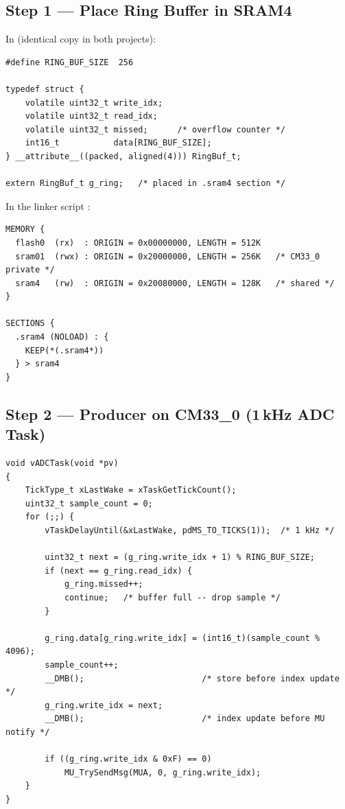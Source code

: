 \documentclass[11pt, a4paper]{article}
\begin{document}
\subsection{Step 1 --- Place Ring Buffer in SRAM4}

In  (identical copy in both projects):

\begin{lstlisting}[style=cstyle]
#define RING_BUF_SIZE  256

typedef struct {
    volatile uint32_t write_idx;
    volatile uint32_t read_idx;
    volatile uint32_t missed;      /* overflow counter */
    int16_t           data[RING_BUF_SIZE];
} __attribute__((packed, aligned(4))) RingBuf_t;

extern RingBuf_t g_ring;   /* placed in .sram4 section */
\end{lstlisting}

In the linker script :

\begin{lstlisting}[style=textstyle]
MEMORY {
  flash0  (rx)  : ORIGIN = 0x00000000, LENGTH = 512K
  sram01  (rwx) : ORIGIN = 0x20000000, LENGTH = 256K   /* CM33_0 private */
  sram4   (rw)  : ORIGIN = 0x20080000, LENGTH = 128K   /* shared */
}

SECTIONS {
  .sram4 (NOLOAD) : {
    KEEP(*(.sram4*))
  } > sram4
}
\end{lstlisting}

\subsection{Step 2 --- Producer on CM33\_0 (1\,kHz ADC Task)}

\begin{lstlisting}[style=cstyle]
void vADCTask(void *pv)
{
    TickType_t xLastWake = xTaskGetTickCount();
    uint32_t sample_count = 0;
    for (;;) {
        vTaskDelayUntil(&xLastWake, pdMS_TO_TICKS(1));  /* 1 kHz */

        uint32_t next = (g_ring.write_idx + 1) % RING_BUF_SIZE;
        if (next == g_ring.read_idx) {
            g_ring.missed++;
            continue;   /* buffer full -- drop sample */
        }

        g_ring.data[g_ring.write_idx] = (int16_t)(sample_count % 4096);
        sample_count++;
        __DMB();                        /* store before index update */
        g_ring.write_idx = next;
        __DMB();                        /* index update before MU notify */

        if ((g_ring.write_idx & 0xF) == 0)
            MU_TrySendMsg(MUA, 0, g_ring.write_idx);
    }
}
\end{lstlisting}
\end{document}
